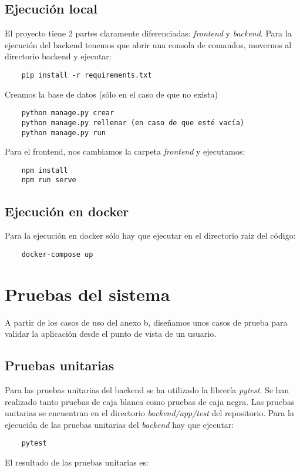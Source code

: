 \subsection {Ejecución local}
El proyecto tiene 2 partes claramente diferenciadas: \emph{frontend} y \emph{backend}.
Para la ejecución del backend tenemos que abrir una consola de comandos, movernos al directorio backend 
y ejecutar:
\begin{verbatim}
	pip install -r requirements.txt
\end{verbatim}

Creamos la base de datos (sólo en el caso de que no exista)
\begin{verbatim}
	python manage.py crear
	python manage.py rellenar (en caso de que esté vacía)
	python manage.py run
\end{verbatim}

Para el frontend, nos cambiamos la carpeta \emph{frontend} y ejecutamos:
\begin{verbatim}
	npm install
	npm run serve
\end{verbatim}

\subsection {Ejecución en docker}
Para la ejecución en docker sólo hay que ejecutar en el directorio raiz del código:
\begin{verbatim}
	docker-compose up
\end{verbatim}
\newpage
\section{Pruebas del sistema}

A partir de los casos de uso del anexo b, diseñamos unos casos de prueba para 
validar la aplicación desde el punto de vista de un usuario.

\subsection{Pruebas unitarias}
Para las pruebas unitarias del backend se ha utilizado la librería \emph{pytest}.
Se han realizado tanto pruebas de caja blanca como pruebas de caja negra.
Las pruebas unitarias se encuentran en el directorio \emph{backend/app/test} del repositorio.
Para la ejecución de las pruebas unitarias del \emph{backend} hay que ejecutar:
\begin{verbatim}
	pytest
\end{verbatim}
El resultado de las pruebas unitarias es:

